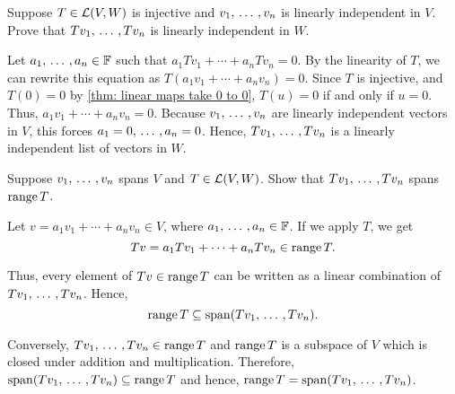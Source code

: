 \setcounter{xrcscount}{7}
\begin{xrcs} %
  Suppose $T \in \mathcal{L}(V,W)$ is injective and $v_1, {\, \ldots \,\,}, v_n$ is linearly independent in $V$. Prove that $Tv_1, {\, \ldots \,\,}, Tv_n$ is linearly independent in $W$.
  \begin{xprf}
    Let $a_1, {\, \ldots \,\,}, a_n \in \mathbb{F}$ such that
    $
    a_1 Tv_1 + \cdots + a_n Tv_n = 0.
    $
    By the linearity of $T$, we can rewrite this equation as
    $
    T(a_1 v_1 + \cdots + a_n v_n) = 0.
    $
    Since $T$ is injective, and $T(0)=0$ by \ref{thm: linear maps take 0 to 0}, $ T(u) = 0 $ if and only if $ u = 0 $. Thus,
    $
    a_1 v_1 + \cdots + a_n v_n = 0.
    $
    Because $v_1, {\, \ldots \,\,}, v_n$ are linearly independent vectors in $V$, this forces $a_1 = 0, {\, \ldots \,\,}, a_n = 0$.
    Hence, $Tv_1, {\, \ldots \,\,}, Tv_n$ is a linearly independent list of vectors in $W$.
  \end{xprf}
\end{xrcs}

\begin{xrcs}
  Suppose $v_1, {\, \ldots \,\,}, v_n$ spans $V$ and $T \in \mathcal{L}(V,W)$. Show that $Tv_1, {\, \ldots \,\,}, Tv_n$ spans $\operatorname{range} T$.

  \begin{xprf}
    Let $v = a_1 v_1 + \cdots + a_n v_n \in V$, where $a_1, {\, \ldots \,\,}, a_n \in \mathbb{F}$. If we apply $T$, we get
    \begin{equation}
      Tv = a_1 T v_1 + \cdots + a_n T v_n \in \operatorname{range} T.
    \end{equation}

    Thus, every element of $Tv \in \operatorname{range} T$ can be written as a linear combination of $Tv_1, {\, \ldots \,\,}, Tv_n$. Hence,
    \begin{equation}
      \operatorname{range} T \subseteq \operatorname{span} (T v_1, {\, \ldots \,\,}, T v_n).
    \end{equation}

    Conversely, \( Tv_1, {\, \ldots \,\,}, Tv_n \in \operatorname{range} T \) and $\operatorname{range} T$ is a subspace of $V$ which is closed under addition and multiplication. Therefore, $\operatorname{span} (Tv_1, {\, \ldots \,\,}, Tv_n) \subseteq \operatorname{range} T$ and hence, $\operatorname{range} T = \operatorname{span} (Tv_1, {\, \ldots \,\,}, Tv_n)$.
  \end{xprf}
\end{xrcs}


